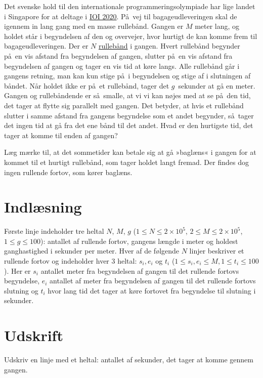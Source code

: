 
Det svenske hold til den internationale programmeringsolympiade har lige landet i Singapore for at deltage i
 \href{https://ioi2020.sg/}{IOI 2020}.
På vej til bagageudleveringen skal de igennem in lang gang med en masse rullebånd.
Gangen er $M$ meter lang, og holdet står i begyndelsen af den og overvejer, hvor hurtigt de kan komme frem til bagageudleveringen. 
Der er $N$ \href{https://sv.wikipedia.org/wiki/Rullande_trottoar}{rullebånd} i gangen.
Hvert rullebånd begynder på en vis afstand fra begyndelsen af gangen, slutter på en vis afstand fra begyndelsen af gangen og tager en vis tid at køre langs.
Alle rullebånd går i gangens retning, man kan kun stige på i begyndelsen og stige af i slutningen af båndet.
Når holdet ikke er på et rullebånd, tager det $g$~sekunder at gå en meter.
Gangen og rullebåndende er så smalle, at vi vi kan nøjes med at se på den tid, det tager at flytte sig parallelt med gangen.
Det betyder, at hvis et rullebånd slutter i samme afstand fra gangens begyndelse som et andet begynder, så tager det ingen tid at gå fra det ene bånd til det andet.
Hvad er den hurtigste tid, det tager at komme til enden af gangen?

Læg mærke til, at det sommetider kan betale sig at gå »baglæns« i gangen for at kommet til et hurtigt rullebånd, som tager holdet langt fremad.
Der findes dog ingen rullende fortov, som kører baglæns.

\section*{Indlæsning}
Første linje indeholder tre heltal $N$, $M$, $g$ ($1 \le N \le 2 \times 10^5$, $2 \le M \le 2 \times 10^5$, $1 \le g \le 100$):
antallet af rullende fortov, gangens længde i meter og holdest ganghastighed i sekunder per meter.
Hver af de følgende $N$ linjer beskriver et rullende fortov og indeholder hver 3 heltal: $s_i, e_i$ og $t_i$
($1\leq s_i,e_i\leq M,1\leq t_i\leq100$).
Her er $s_i$  antallet meter fra begyndelsen af gangen til det rullende fortovs begyndelse, $e_i$ antallet af meter fra begyndelsen af gangen til det rullende fortovs slutning og $t_i$ hvor lang tid det tager at køre fortovet fra begyndelse til slutning i sekunder.

\section*{Udskrift}
Udskriv en linje med et heltal: antallet af sekunder, det tager at komme gennem gangen.

